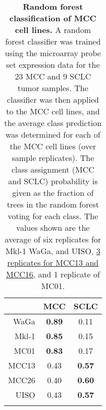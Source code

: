 \documentclass[10pt]{article}
\begin{document}
\clearpage



    
    
  

\clearpage

\begin{table}[H]

  \begin{center}
    
    \caption{
      \textbf{Random forest classification of MCC cell lines.}
      A random forest classifier was trained using the microarray probe set expression data for the 23 MCC and 9 SCLC tumor samples.
      The classifier was then applied to the MCC cell lines, and the average class prediction was determined for each of the MCC cell lines (over sample replicates).
      The class assignment (MCC and SCLC) probability is given as the fraction of trees in the random forest voting for each class.
      The values shown are the average of six replicates for Mkl-1 WaGa,  and UISO, \uline{3 replicates for MCC13 and MCC16,} and 1 replicate of MC01.
    }
    
    \begin{tabular}{rcc}
      \hline 
      & MCC  & SCLC \tabularnewline
      \hline 
      WaGa & \textbf{0.89} & 0.11\tabularnewline
      Mkl-1 & \textbf{0.85} & 0.15\tabularnewline
      MC01 & \textbf{0.83} & 0.17\tabularnewline
      MCC13 &0.43 & \textbf{0.57}\tabularnewline
      MCC26 & 0.40 & \textbf{0.60}\tabularnewline
      UISO & 0.43 & \textbf{0.57}\tabularnewline
      \hline 
      \label{tab:classifier}

    \end{tabular}
    
  \end{center}
  
\end{table}
\end{document}
